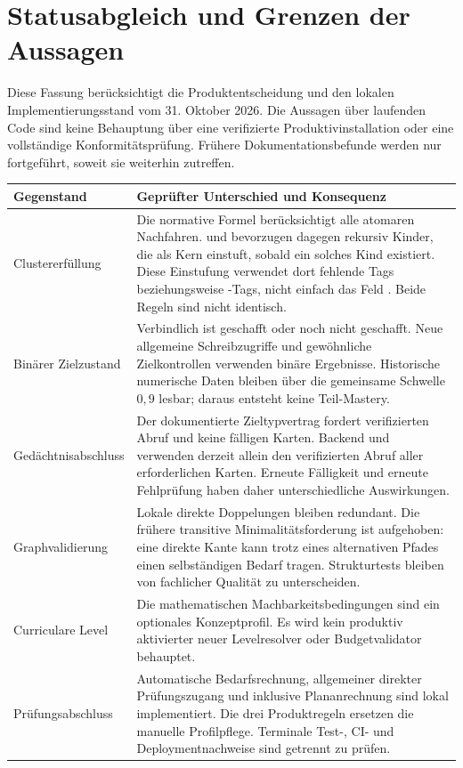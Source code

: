 \appendix
\section{Statusabgleich und Grenzen der Aussagen}
\label{sec:implementation}
Diese Fassung berücksichtigt die Produktentscheidung und den lokalen
Implementierungsstand vom 31. Oktober 2026. Die Aussagen über laufenden Code
sind keine Behauptung über eine verifizierte Produktivinstallation oder eine
vollständige Konformitätsprüfung. Frühere Dokumentationsbefunde werden nur
fortgeführt, soweit sie weiterhin zutreffen.

\begin{longtable}{@{}P{32mm}P{116mm}@{}}
\toprule
Gegenstand & Geprüfter Unterschied und Konsequenz\\
\midrule\endhead
Clustererfüllung & Die normative Formel berücksichtigt alle atomaren
Nachfahren.  und
 bevorzugen dagegen rekursiv
Kinder, die  als Kern einstuft, sobald ein
solches Kind existiert. Diese Einstufung verwendet dort fehlende Tags
beziehungsweise -Tags, nicht einfach das Feld .
Beide Regeln sind nicht identisch.\\
Binärer Zielzustand & Verbindlich ist geschafft oder noch nicht geschafft.
Neue allgemeine Schreibzugriffe und gewöhnliche Zielkontrollen verwenden
binäre Ergebnisse. Historische numerische Daten bleiben über die gemeinsame
Schwelle $0{,}9$ lesbar; daraus entsteht keine Teil-Mastery.\\
Gedächtnisabschluss & Der dokumentierte Zieltypvertrag fordert
verifizierten Abruf und keine fälligen Karten. Backend und
 verwenden derzeit allein den verifizierten Abruf
aller erforderlichen Karten. Erneute Fälligkeit und erneute
Fehlprüfung haben daher unterschiedliche Auswirkungen.\\
Graphvalidierung & Lokale direkte Doppelungen bleiben redundant.
Die frühere transitive Minimalitätsforderung ist aufgehoben: eine direkte
Kante kann trotz eines alternativen Pfades einen selbständigen Bedarf
tragen. Strukturtests bleiben von fachlicher Qualität zu unterscheiden.\\
Curriculare Level & Die mathematischen Machbarkeitsbedingungen sind ein
optionales Konzeptprofil. Es wird kein produktiv aktivierter neuer
Levelresolver oder Budgetvalidator behauptet.\\
Prüfungsabschluss & Automatische Bedarfsrechnung, allgemeiner direkter
Prüfungszugang und inklusive Plananrechnung sind lokal implementiert.
Die drei Produktregeln ersetzen die manuelle Profilpflege. Terminale
Test-, CI- und Deploymentnachweise sind getrennt zu prüfen.\\
\bottomrule
\end{longtable}


